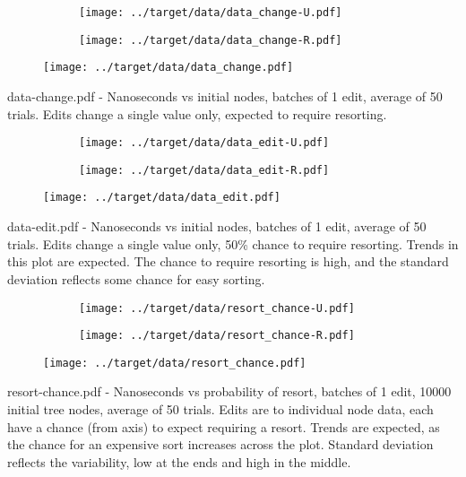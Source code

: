 \documentclass{article}
\begin{document}
\begin{figure}[H]
  \centering
  \begin{subfigure}{.5\textwidth}
    \texttt{[image: ../target/data/data\_change-U.pdf]}
  \end{subfigure}%
  \begin{subfigure}{.5\textwidth}
    \texttt{[image: ../target/data/data\_change-R.pdf]}
  \end{subfigure}
  \texttt{[image: ../target/data/data\_change.pdf]}
\end{figure}
data-change.pdf - Nanoseconds vs initial nodes, batches of 1 edit, average of 50 trials. Edits change a single value only, expected to require resorting. 

\begin{figure}[H]
  \centering
  \begin{subfigure}{.5\textwidth}
    \texttt{[image: ../target/data/data\_edit-U.pdf]}
  \end{subfigure}%
  \begin{subfigure}{.5\textwidth}
    \texttt{[image: ../target/data/data\_edit-R.pdf]}
  \end{subfigure}
  \texttt{[image: ../target/data/data\_edit.pdf]}
\end{figure}
data-edit.pdf - Nanoseconds vs initial nodes, batches of 1 edit, average of 50 trials. Edits change a single value only, 50\% chance to require resorting. Trends in this plot are expected. The chance to require resorting is high, and the standard deviation reflects some chance for easy sorting.

\begin{figure}[H]
  \centering
  \begin{subfigure}{.5\textwidth}
    \texttt{[image: ../target/data/resort\_chance-U.pdf]}
  \end{subfigure}%
  \begin{subfigure}{.5\textwidth}
    \texttt{[image: ../target/data/resort\_chance-R.pdf]}
  \end{subfigure}
  \texttt{[image: ../target/data/resort\_chance.pdf]}
\end{figure}
resort-chance.pdf - Nanoseconds vs probability of resort, batches of 1 edit, 10000 initial tree nodes, average of 50 trials. Edits are to individual node data, each have a chance (from axis) to expect requiring a resort. Trends are expected, as the chance for an expensive sort increases across the plot. Standard deviation reflects the variability, low at the ends and high in the middle.
\end{document}
